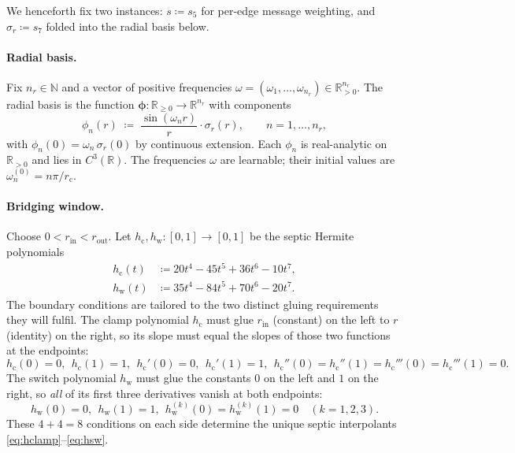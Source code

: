 \documentclass[11pt,a4paper]{article}
\newcommand{\R}{\mathbb{R}}
\newcommand{\N}{\mathbb{N}}
\newcommand{\bphi}{\bm{\phi}}
\newcommand{\rcut}{r_{\mathrm{c}}}
\newcommand{\rin}{r_{\mathrm{in}}}
\newcommand{\rout}{r_{\mathrm{out}}}
\theoremstyle{plain}
\theoremstyle{definition}
\theoremstyle{remark}
\begin{document}
We henceforth fix two instances: $s\coloneqq s_5$ for per-edge message
weighting, and $\sigma_r\coloneqq s_7$ folded into the radial basis below.

\paragraph{Radial basis.}
Fix $n_r\in\N$ and a vector of positive frequencies
$\omega=(\omega_1,\dots,\omega_{n_r})\in\R_{>0}^{n_r}$. The radial basis is the
function $\bphi:\R_{\geq 0}\to\R^{n_r}$ with components
\begin{equation}\label{eq:rbf}
    \phi_n(r)\;\coloneqq\;\frac{\sin(\omega_n r)}{r}\cdot \sigma_r(r),\qquad n=1,\dots,n_r,
\end{equation}
with $\phi_n(0)=\omega_n\,\sigma_r(0)$ by continuous extension.
Each $\phi_n$ is real-analytic on $\R_{>0}$ and lies in $C^3(\R)$.
The frequencies $\omega$ are learnable; their initial values are $\omega_n^{(0)}=n\pi/\rcut$.

\paragraph{Bridging window.}
Choose $0<\rin<\rout$. Let $h_{\mathrm{c}},h_{\mathrm{w}}:[0,1]\to[0,1]$ be the
septic Hermite polynomials
\begin{align}
    h_{\mathrm{c}}(t) & \coloneqq 20t^4-45t^5+36t^6-10t^7,\label{eq:hclamp} \\
    h_{\mathrm{w}}(t) & \coloneqq 35t^4-84t^5+70t^6-20t^7.\label{eq:hsw}
\end{align}
The boundary conditions are tailored to the two distinct gluing requirements they will fulfil.
The clamp polynomial $h_{\mathrm{c}}$ must glue $\rin$ (constant) on the left to $r$ (identity) on the right, so its slope must equal the slopes of those two functions at the endpoints:
\begin{equation}\label{eq:hc-bcs}
    h_{\mathrm{c}}(0)=0,\ \ h_{\mathrm{c}}(1)=1,\ \ h_{\mathrm{c}}'(0)=0,\ \ h_{\mathrm{c}}'(1)=1,\ \ h_{\mathrm{c}}''(0)=h_{\mathrm{c}}''(1)=h_{\mathrm{c}}'''(0)=h_{\mathrm{c}}'''(1)=0.
\end{equation}
The switch polynomial $h_{\mathrm{w}}$ must glue the constants $0$ on the left and $1$ on the right, so \emph{all} of its first three derivatives vanish at both endpoints:
\begin{equation}\label{eq:hw-bcs}
    h_{\mathrm{w}}(0)=0,\ \ h_{\mathrm{w}}(1)=1,\ \ h_{\mathrm{w}}^{(k)}(0)=h_{\mathrm{w}}^{(k)}(1)=0\quad(k=1,2,3).
\end{equation}
These $4+4=8$ conditions on each side determine the unique septic interpolants \eqref{eq:hclamp}--\eqref{eq:hsw}.
\end{document}

